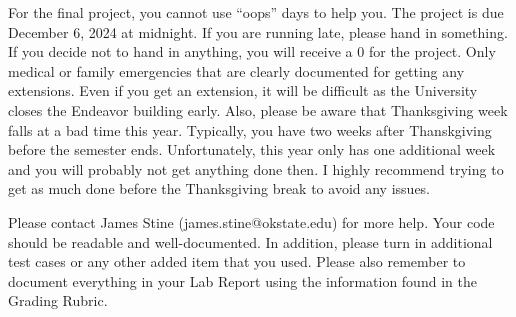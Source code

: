\documentclass{article}
\begin{document}
For the final project, you cannot use ``oops'' days to help you.  The
project is due December 6, 2024 at midnight.  If you are running late,
please hand in something.  If you decide not to hand in anything, you
will receive a $0$ for the project.   Only medical or family
emergencies that are clearly documented for getting any extensions.
Even if you get an extension, it will be difficult as the University
closes the Endeavor building early.  Also, please be aware that
Thanksgiving week falls at a bad time this year. Typically, you have
two weeks after Thanskgiving before the semester ends.  Unfortunately,
this year only has one additional week and you will probably not get
anything done then.  I highly recommend trying to get as much done
before the Thanksgiving break to avoid any issues.  

Please contact James Stine (james.stine@okstate.edu) 
for more help.  Your code should be
readable and well-documented. In addition, please turn in additional
test cases or any other added item that you used. 
Please also remember to document everything in your Lab Report using
the information found in the Grading Rubric.

   


\end{document}
